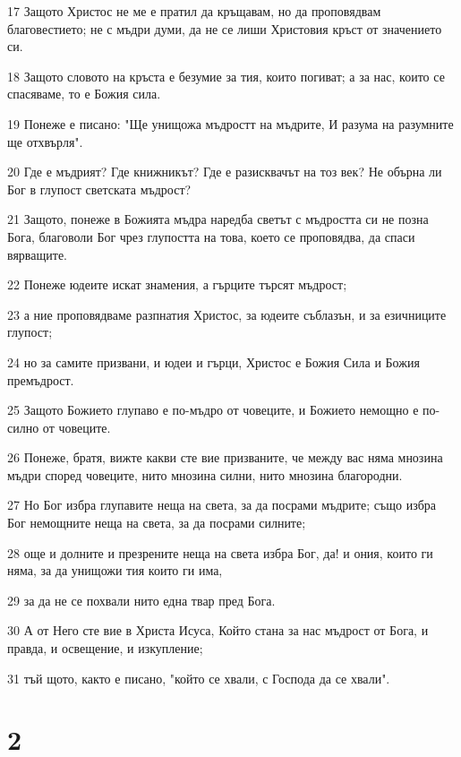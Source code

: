 \par 17 Защото Христос не ме е пратил да кръщавам, но да проповядвам благовестието; не с мъдри думи, да не се лиши Христовия кръст от значението си.
\par 18 Защото словото на кръста е безумие за тия, които погиват; а за нас, които се спасяваме, то е Божия сила.
\par 19 Понеже е писано: "Ще унищожа мъдростт на мъдрите, И разума на разумните ще отхвърля".
\par 20 Где е мъдрият? Где книжникът? Где е разисквачът на тоз век? Не обърна ли Бог в глупост светската мъдрост?
\par 21 Защото, понеже в Божията мъдра наредба светът с мъдростта си не позна Бога, благоволи Бог чрез глупостта на това, което се проповядва, да спаси вярващите.
\par 22 Понеже юдеите искат знамения, а гърците търсят мъдрост;
\par 23 а ние проповядваме разпнатия Христос, за юдеите съблазън, и за езичниците глупост;
\par 24 но за самите призвани, и юдеи и гърци, Христос е Божия Сила и Божия премъдрост.
\par 25 Защото Божието глупаво е по-мъдро от човеците, и Божието немощно е по-силно от човеците.
\par 26 Понеже, братя, вижте какви сте вие призваните, че между вас няма мнозина мъдри според човеците, нито мнозина силни, нито мнозина благородни.
\par 27 Но Бог избра глупавите неща на света, за да посрами мъдрите; също избра Бог немощните неща на света, за да посрами силните;
\par 28 още и долните и презрените неща на света избра Бог, да! и ония, които ги няма, за да унищожи тия които ги има,
\par 29 за да не се похвали нито една твар пред Бога.
\par 30 А от Него сте вие в Христа Исуса, Който стана за нас мъдрост от Бога, и правда, и освещение, и изкупление;
\par 31 тъй щото, както е писано, "който се хвали, с Господа да се хвали".

\chapter{2}

